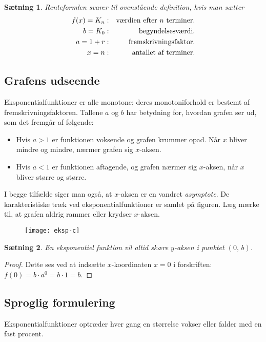 \documentclass[12pt,oneside,a4paper]{article}
\newcommand{\bas}{\begin{eqnarray*}}
\newcommand{\eas}{\end{eqnarray*}}
\theoremstyle{plain}
\newtheorem*{thm}{Sætning}
\begin{document}
\begin{thm}
    Renteformlen svarer til ovenstående definition, hvis man sætter
    \bas
    f(x) = K_n & : & \hbox{værdien efter $n$ terminer.} \\
       b = K_0 & : & \hbox{begyndelsesværdi.} \\
       a = 1+r & : & \hbox{fremskrivningsfaktor.} \\
       x = n   & : & \hbox{antallet af terminer.}
    \eas
\end{thm}

\subsection*{Grafens udseende}
Eksponentialfunktioner er alle monotone; deres monotoniforhold er bestemt af
fremskrivningsfaktoren. Tallene $a$ og $b$ har betydning for, hvordan grafen
ser ud, som det fremgår af følgende:

\begin{itemize}
    \item Hvis $a>1$ er funktionen voksende og grafen krummer opad.
        Når $x$ bliver mindre og mindre, nærmer grafen
        sig $x$-aksen.
    \item Hvis $a<1$ er funktionen aftagende, og grafen nærmer sig
        $x$-aksen, når $x$ bliver større og større.
\end{itemize}

I begge tilfælde siger man også, at $x$-aksen er en vandret {\em asymptote}.
De karakteristiske træk ved eksponentialfunktioner er samlet på figuren.  Læg
mærke til, at grafen aldrig rammer eller krydser $x$-aksen.

\begin{figure}[ht]
    \centering
    \texttt{[image: eksp-c]}
    \label{eksp-c}
\end{figure}

\begin{thm}
    En eksponentiel funktion vil altid skære $y$-aksen i punktet $(0,\,b)$.
\end{thm}
\begin{proof}
    Dette ses ved at indsætte $x$-koordinaten $x=0$ i forskriften:
    $f(0) = b\cdot a^0 = b\cdot 1 = b$.
\end{proof}

\subsection*{Sproglig formulering}
Eksponentialfunktioner optræder hver gang en størrelse vokser eller falder
med en fast procent.
\end{document}
